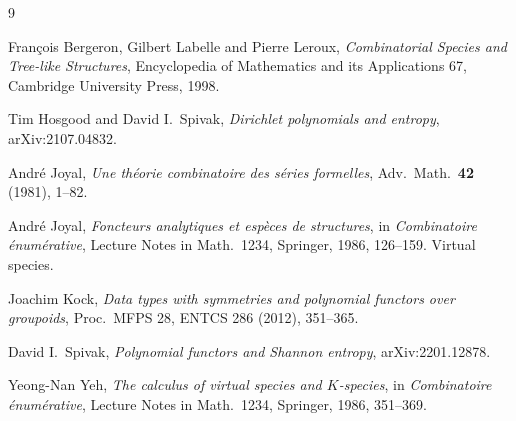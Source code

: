 \documentclass[11pt,a4paper]{article}
\theoremstyle{definition}
\theoremstyle{remark}
\begin{document}
\begin{thebibliography}{9}

 Fran\c{c}ois Bergeron, Gilbert Labelle and Pierre Leroux,
\emph{Combinatorial Species and Tree-like Structures}, Encyclopedia of Mathematics
and its Applications 67, Cambridge University Press, 1998.

 Tim Hosgood and David I.\ Spivak, \emph{Dirichlet
polynomials and entropy}, arXiv:2107.04832.

 Andr\'e Joyal, \emph{Une th\'eorie combinatoire des s\'eries
formelles}, Adv.\ Math.\ \textbf{42} (1981), 1--82.

 Andr\'e Joyal, \emph{Foncteurs analytiques et esp\`eces de
structures}, in \emph{Combinatoire \'enum\'erative}, Lecture Notes in Math.\ 1234,
Springer, 1986, 126--159. Virtual species.

 Joachim Kock, \emph{Data types with symmetries and polynomial
functors over groupoids}, Proc.\ MFPS 28, ENTCS 286 (2012), 351--365.

 David I.\ Spivak, \emph{Polynomial functors and Shannon
entropy}, arXiv:2201.12878.

 Yeong-Nan Yeh, \emph{The calculus of virtual species and $K$-species},
in \emph{Combinatoire \'enum\'erative}, Lecture Notes in Math.\ 1234, Springer,
1986, 351--369.

\end{thebibliography}
\end{document}
